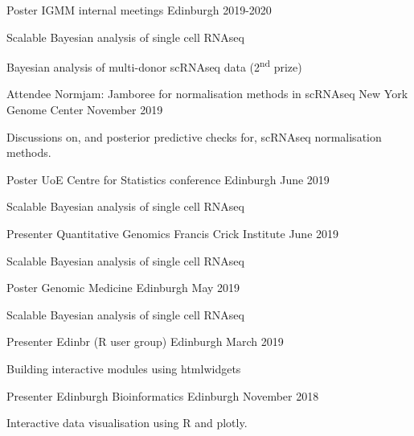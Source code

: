 
\begin{cventries}
  \cventry
  {Poster}
  {IGMM internal meetings}
  {Edinburgh}
  {2019-2020}
  {
    \begin{cvitems}
      \item 
        Scalable Bayesian analysis of single cell RNAseq
      \item 
        Bayesian analysis of multi-donor scRNAseq data (2\textsuperscript{nd} prize)
    \end{cvitems}
  }

  \cventry
  {Attendee}
  {Normjam: Jamboree for normalisation methods in scRNAseq}
  {New York Genome Center}
  {November 2019}
  {
    \begin{cvitems}
      \item 
        Discussions on, and posterior predictive checks for,
        scRNAseq normalisation methods.
    \end{cvitems}
  }
  \cventry
  {Poster}
  {UoE Centre for Statistics conference}
  {Edinburgh}
  {June 2019}
  {
    \begin{cvitems}
      \item 
        Scalable Bayesian analysis of single cell RNAseq
    \end{cvitems}
  }

  \cventry
  {Presenter} %
  {Quantitative Genomics} %
  {Francis Crick Institute} %
  {June 2019} %
  { %
    \begin{cvitems}
      \item 
        Scalable Bayesian analysis of single cell RNAseq
    \end{cvitems}
  }
  \cventry
  {Poster}
  {Genomic Medicine}
  {Edinburgh}
  {May 2019}
  {
    \begin{cvitems}
      \item 
        Scalable Bayesian analysis of single cell RNAseq
    \end{cvitems}
  }


  \cventry
  {Presenter} %
  {Edinbr (R user group)} %
  {Edinburgh} %
  {March 2019} %
  { %
    \begin{cvitems}
      \item 
        Building interactive modules using htmlwidgets
    \end{cvitems}
  }

  \cventry
  {Presenter} %
  {Edinburgh Bioinformatics} %
  {Edinburgh} %
  {November 2018} %
  { %
    \begin{cvitems}
      \item 
        Interactive data visualisation using R and plotly.
    \end{cvitems}
  }


\end{cventries}
